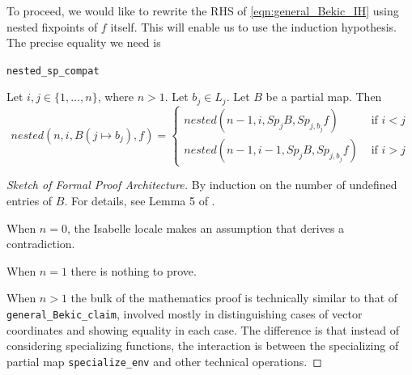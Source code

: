 To proceed, we would like to rewrite the RHS of \autoref{eqn:general_Bekic_IH} using nested fixpoints of $f$ itself. This will enable us to use the induction hypothesis. The precise equality we need is

\begin{blemma}

\texttt{nested\_sp\_compat}


\label{lem:shift}
    Let $i,j\in \{1,\dots,n\}$, where $n>1$. Let $b_j\in L_j$. Let $B$ be a partial map. Then
    \begin{equation}
        \label{eqn:shift}
        nested(n,i,B(j\mapsto b_j), f) = \begin{cases}
            nested(n-1,i,Sp_jB,Sp_{j,b_j}f) & \text{ if } i<j \\
            nested(n-1,i-1,Sp_jB,Sp_{j,b_j}f) & \text{ if } i>j
        \end{cases}
    \end{equation}
\end{blemma}
\begin{proof}[Sketch of Formal Proof Architecture]
    By induction on the number of undefined entries of $B$. For details, see Lemma 5 of \cite{xu2025}.

    When $n=0$, the Isabelle locale makes an assumption that derives a contradiction.

    When $n=1$ there is nothing to prove.

    When $n>1$ the bulk of the mathematics proof is technically similar to that of \texttt{general\_Bekic\_claim}, involved mostly in distinguishing cases of vector coordinates and showing equality in each case. The difference is that instead of considering specializing functions, the interaction is between the specializing of partial map \texttt{specialize\_env} and other technical operations. 
\end{proof}

